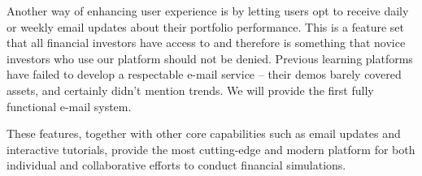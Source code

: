 Another way of enhancing user experience is by letting users opt to receive daily or weekly email updates about their portfolio performance. This is a feature set that all financial investors have access to and therefore is something that novice investors who use our platform should not be denied. Previous learning platforms have failed to develop a respectable e-mail service -- their demos barely covered assets, and certainly didn't mention trends. We will provide the first fully functional e-mail system.

These features, together with other core capabilities such as email updates and interactive tutorials, provide the most cutting-edge and modern platform for both individual and collaborative efforts to conduct financial simulations. 